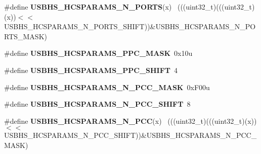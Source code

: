 \begin{DoxyCompactItemize}
\item 
\hypertarget{group___u_s_b_h_s___register___masks_ga51db7cbc5e9a33c48c27bbab4d16afdb}{}\#define {\bfseries U\+S\+B\+H\+S\+\_\+\+H\+C\+S\+P\+A\+R\+A\+M\+S\+\_\+\+N\+\_\+\+P\+O\+R\+T\+S}(x)                          ~(((uint32\+\_\+t)(((uint32\+\_\+t)(x))$<$$<$U\+S\+B\+H\+S\+\_\+\+H\+C\+S\+P\+A\+R\+A\+M\+S\+\_\+\+N\+\_\+\+P\+O\+R\+T\+S\+\_\+\+S\+H\+I\+F\+T))\&U\+S\+B\+H\+S\+\_\+\+H\+C\+S\+P\+A\+R\+A\+M\+S\+\_\+\+N\+\_\+\+P\+O\+R\+T\+S\+\_\+\+M\+A\+S\+K)\label{group___u_s_b_h_s___register___masks_ga51db7cbc5e9a33c48c27bbab4d16afdb}

\item 
\hypertarget{group___u_s_b_h_s___register___masks_gac86dff6a1945f6d9b84713b233e2fe82}{}\#define {\bfseries U\+S\+B\+H\+S\+\_\+\+H\+C\+S\+P\+A\+R\+A\+M\+S\+\_\+\+P\+P\+C\+\_\+\+M\+A\+S\+K}~0x10u\label{group___u_s_b_h_s___register___masks_gac86dff6a1945f6d9b84713b233e2fe82}

\item 
\hypertarget{group___u_s_b_h_s___register___masks_ga87a18a79b5f9e235a9ff1608502c9d1b}{}\#define {\bfseries U\+S\+B\+H\+S\+\_\+\+H\+C\+S\+P\+A\+R\+A\+M\+S\+\_\+\+P\+P\+C\+\_\+\+S\+H\+I\+F\+T}~4\label{group___u_s_b_h_s___register___masks_ga87a18a79b5f9e235a9ff1608502c9d1b}

\item 
\hypertarget{group___u_s_b_h_s___register___masks_ga9ef4b22e58ec4ecd4ec1aa3333d57606}{}\#define {\bfseries U\+S\+B\+H\+S\+\_\+\+H\+C\+S\+P\+A\+R\+A\+M\+S\+\_\+\+N\+\_\+\+P\+C\+C\+\_\+\+M\+A\+S\+K}~0x\+F00u\label{group___u_s_b_h_s___register___masks_ga9ef4b22e58ec4ecd4ec1aa3333d57606}

\item 
\hypertarget{group___u_s_b_h_s___register___masks_ga5eb1e23db6d7b07ffd8bffa18b050b8e}{}\#define {\bfseries U\+S\+B\+H\+S\+\_\+\+H\+C\+S\+P\+A\+R\+A\+M\+S\+\_\+\+N\+\_\+\+P\+C\+C\+\_\+\+S\+H\+I\+F\+T}~8\label{group___u_s_b_h_s___register___masks_ga5eb1e23db6d7b07ffd8bffa18b050b8e}

\item 
\hypertarget{group___u_s_b_h_s___register___masks_gad0f6918664a751a0f84fadf91a009601}{}\#define {\bfseries U\+S\+B\+H\+S\+\_\+\+H\+C\+S\+P\+A\+R\+A\+M\+S\+\_\+\+N\+\_\+\+P\+C\+C}(x)                              ~(((uint32\+\_\+t)(((uint32\+\_\+t)(x))$<$$<$U\+S\+B\+H\+S\+\_\+\+H\+C\+S\+P\+A\+R\+A\+M\+S\+\_\+\+N\+\_\+\+P\+C\+C\+\_\+\+S\+H\+I\+F\+T))\&U\+S\+B\+H\+S\+\_\+\+H\+C\+S\+P\+A\+R\+A\+M\+S\+\_\+\+N\+\_\+\+P\+C\+C\+\_\+\+M\+A\+S\+K)\label{group___u_s_b_h_s___register___masks_gad0f6918664a751a0f84fadf91a009601}


\end{DoxyCompactItemize}
